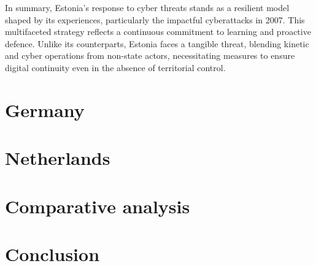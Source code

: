 In summary, Estonia's response to cyber threats stands as a resilient model shaped by its experiences, particularly the impactful cyberattacks in 2007. This multifaceted strategy reflects a continuous commitment to learning and proactive defence. Unlike its counterparts, Estonia faces a tangible threat, blending kinetic and cyber operations from non-state actors, necessitating measures to ensure digital continuity even in the absence of territorial control.

\section{Germany}

\section{Netherlands}

\section{Comparative analysis}

\section{Conclusion}

